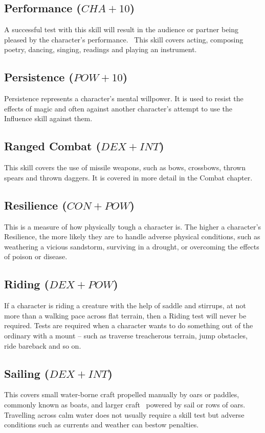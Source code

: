 \subsection{Performance ($CHA+10$)}
A successful test with this skill will result in the audience or partner being pleased by the character’s performance.  This skill covers acting, composing poetry, dancing, singing, readings and playing an instrument. 

\subsection{Persistence ($POW+10$)}
Persistence represents a character’s mental willpower. It is used to resist the effects of magic and often against another character’s attempt to use the Influence skill against them.  

\subsection{Ranged Combat ($DEX+INT$)}
This skill covers the use of missile weapons, such as bows, crossbows, thrown spears and thrown daggers. It is covered in more detail in the Combat chapter.

\subsection{Resilience ($CON+POW$)}
This is a measure of how physically tough a character is. The higher a character’s Resilience, the more likely they are to handle adverse physical conditions, such as weathering a vicious sandstorm, surviving in a drought, or overcoming the effects of poison or disease. 


\subsection{Riding ($DEX+POW$)}
If a character is riding a creature with the help of saddle and stirrups, at not more than a walking pace across flat terrain, then a Riding test will never be required. Tests are required when a character wants to do something out of the ordinary with a mount – such as traverse treacherous terrain, jump obstacles, ride bareback and so on. 



\subsection{Sailing ($DEX+INT$)}
This covers small water-borne craft propelled manually by oars or paddles, commonly known as boats, and larger craft  powered by sail or rows of oars. Travelling across calm water does not usually require a skill test but adverse conditions such as currents and weather can bestow penalties. 

